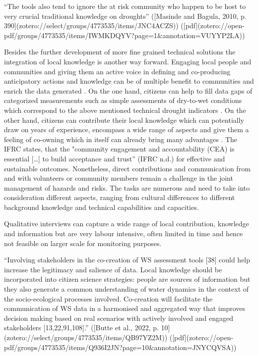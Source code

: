 {%

“The tools also tend to ignore the at risk community who happen to be host to very crucial traditional knowledge on droughts” ([Masinde and Bagula, 2010, p. 390](zotero://select/groups/4773535/items/JNC4ACZS)) ([pdf](zotero://open-pdf/groups/4773535/items/IWMKDQYV?page=1&annotation=VUYYP2LA))

Besides the further development of more fine grained technical solutions the integration of local knowledge is another way forward. Engaging local people and communities and giving them an active voice in defining and co-producing anticipatory actions and knowledge can be of multiple benefit to communities and enrich the data generated \autocite{somaliredcrescentsocietyFeasibilityStudyPotential2022, njambi-szlapkaIntegratingCommunityVoices}. On the one hand, citizens can help to fill data gaps of categorized measurements such as simple assessments of dry-to-wet conditions which correspond to the above mentioned technical drought indicators \autocite{lackstromBackyardHydroclimatologyCitizen2022}. On the other hand, citizens can contribute their local knowledge which can potentially draw on years of experience, encompass a wide range of aspects and give them a feeling of co-owning which in itself can already bring many advantages \autocite{njambi-szlapkaIntegratingCommunityVoices}. The IFRC states, that the "community engagement and accountability (CEA) is essential […] to build acceptance and trust” \autocite{ifrcCommunityEngagementAccountability}(IFRC n.d.) for effective and sustainable outcomes. 
Nonetheless, direct contributions and communication from and with volunteers or community members remain a challenge in the joint management of hazards and risks. The tasks are numerous and need to take into consideration different aspects, ranging from cultural differences to different background knowledge and technical capabilities and capacities.



Qualitative interviews can capture a wide range of local contribution, knowledge and information but are very labour intensive, often limited in time and hence not feasible on larger scale for monitoring purposes.

“Involving stakeholders in the co-creation of WS assessment tools [38] could help increase the legitimacy and salience of data. Local knowledge should be incorporated into citizen science strategies: people are sources of information but they also generate a common understanding of water dynamics in the context of the socio-ecological processes involved. Co-creation will facilitate the communication of WS data in a harmonised and aggregated way that improves decision making based on real scenarios with actively involved and engaged stakeholders [13,22,91,108].” ([Butte et al., 2022, p. 10](zotero://select/groups/4773535/items/QB97YZ2M)) ([pdf](zotero://open-pdf/groups/4773535/items/Q936I2JN?page=10&annotation=JNYCQVSA))

}
